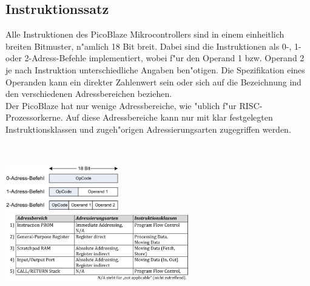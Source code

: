 \subsection{Instruktionssatz}
\begin{minipage}{9cm}
	Alle Instruktionen des PicoBlaze Mikrocontrollers sind in einem einheitlich breiten Bitmuster, n"amlich 18 Bit breit. Dabei sind die Instruktionen als 0-, 1- oder 2-Adress-Befehle implementiert, wobei f"ur den Operand 1 bzw. Operand 2 je nach Instruktion unterschiedliche Angaben ben"otigen. Die Spezifikation eines Operanden kann ein direkter Zahlenwert sein oder sich auf die Bezeichnung ind den verschiedenen Adressbereichen beziehen.\\

	Der PicoBlaze hat nur wenige Adressbereiche, wie "ublich f"ur RISC-Prozessorkerne. Auf diese Adressbereiche kann nur mit klar festgelegten Instruktionsklassen und zugeh"origen Adressierungsarten zugegriffen werden.
\end{minipage}
%
\begin{minipage}{0.5cm}
	\ \
\end{minipage}
%
\begin{minipage}{9cm}
	\includegraphics[width=5cm]{pics/PicoBlaze-OpGroesse}\\
	
	\includegraphics[width=8cm]{pics/PicoBlaze-Adressierung}
\end{minipage}

